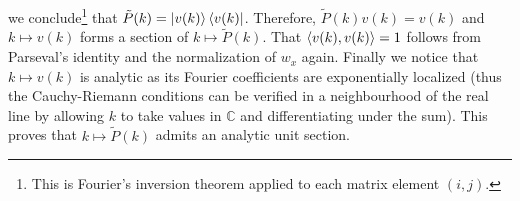 \documentclass[a4paper,11pt]{article}
\newcommand{\C}{\mathbb{C}}
\numberwithin{equation}{section}
\begin{document}
 	 we conclude\footnote{This is Fourier's inversion theorem applied to each matrix element $ (i,j) $.} that $ \tilde{P}(k)=\ket{v(k)}\bra{v(k)} $. Therefore, $ \tilde{P}(k)v(k)=v(k) $ and $ k\mapsto v(k) $ forms a section of $ k\mapsto\tilde{P}(k) $. That $ \braket{v(k),v(k)}=1 $ follows from Parseval's identity and the normalization of $ w_x $ again. Finally we notice that $ k\mapsto v(k) $ is analytic as its Fourier coefficients are exponentially localized (thus the Cauchy-Riemann conditions can be verified in a neighbourhood of the real line by allowing $ k $ to take values in $ \C $ and differentiating under the sum). This proves that $ k\mapsto \tilde{P}(k) $ admits an analytic unit section.
\end{document}
